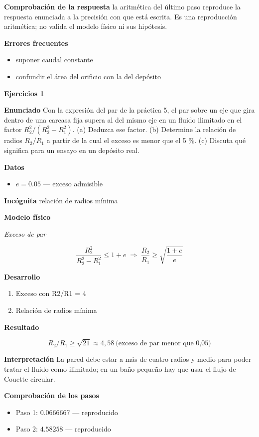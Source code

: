 \documentclass[10pt,openany]{book}
\begin{document}
\noindent\textbf{Comprobación de la respuesta} la aritmética del último paso reproduce la respuesta enunciada a la precisión con que está escrita. Es una reproducción aritmética; no valida el modelo físico ni sus hipótesis.

\noindent\textbf{Errores frecuentes}
\begin{itemize}
\item suponer caudal constante
\item confundir el área del orificio con la del depósito
\end{itemize}

\noindent\textbf{Ejercicios 1}

\noindent\textbf{Enunciado}
Con la expresión del par de la práctica 5, el par sobre un eje que gira dentro de una carcasa fija supera al del mismo eje en un fluido ilimitado en el factor \(R_2^{2}/(R_2^{2} - R_1^{2})\). (a) Deduzca ese factor. (b) Determine la relación de radios \(R_2/R_1\) a partir de la cual el exceso es menor que el 5 \%. (c) Discuta qué significa para un ensayo en un depósito real.

\noindent\textbf{Datos}
\begin{itemize}
\item $e = 0.05$ — exceso admisible
\end{itemize}

\noindent\textbf{Incógnita}
relación de radios mínima

\noindent\textbf{Modelo físico}

\noindent\textit{Exceso de par}

\[
\frac{R_2^{2}}{R_2^{2} - R_1^{2}} \le 1 + e \;\Rightarrow\; \frac{R_2}{R_1} \ge \sqrt{\frac{1 + e}{e}}
\]

\noindent\textbf{Desarrollo}
\begin{enumerate}
\item
Exceso con R2/R1 = 4
\item
Relación de radios mínima
\end{enumerate}

\noindent\textbf{Resultado}

\[
R_2/R_1 \ge \sqrt{21} \approx 4{,}58\ \text{(exceso de par menor que 0,05)}
\]

\noindent\textbf{Interpretación}
La pared debe estar a más de cuatro radios y medio para poder tratar el fluido como ilimitado; en un baño pequeño hay que usar el flujo de Couette circular.

\noindent\textbf{Comprobación de los pasos}
\begin{itemize}
\item Paso 1: $0.0666667$ — reproducido
\item Paso 2: $4.58258$ — reproducido
\end{itemize}
\end{document}
